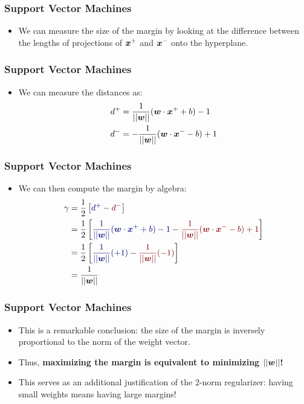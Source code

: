 \documentclass[trans]{beamer}
\begin{document}
\begin{frame}
  \frametitle{Support Vector Machines}
\begin{itemize}
\item We can measure the size of the margin by
looking at the difference between the lengths of projections of
${\boldsymbol{x}}^+$ and ${\boldsymbol{x}}^-$ onto the hyperplane.  
\end{itemize}
\end{frame}
\begin{frame}
  \frametitle{Support Vector Machines}
\begin{itemize}
\item 
We can measure the distances as:
%
\begin{align}
d^+ &= \frac 1 {\left\vert\left\vert {\boldsymbol{w}} \right\vert\right\vert} ({\boldsymbol{w}} \cdot {\boldsymbol{x}}^+ + b) - 1 \\
d^- &= - \frac 1 {\left\vert\left\vert {\boldsymbol{w}} \right\vert\right\vert}({\boldsymbol{w}} \cdot {\boldsymbol{x}}^- - b) + 1
\end{align}
%
\end{itemize}
\end{frame}
\begin{frame}
  \frametitle{Support Vector Machines}
\begin{itemize}
\item We can then compute the margin by algebra:
%
\begin{align}
\ga
&= \frac 1 2 \left[ \textcolor{darkblue}{d^+} 
                  - \textcolor{darkred}{d^-} \right] \\
&= \frac 1 2
   \left[
   \textcolor{darkblue}{\frac 1 {\norm{\vw}} (\dotp{\vw}{\vx^+} + b) - 1}
 - \textcolor{darkred}{\frac 1 {\norm{\vw}} (\dotp{\vw}{\vx^-} - b) + 1}
   \right]
\\
&= \frac 1 2 \left[
   \textcolor{darkblue}{\frac 1 {\norm{\vw}} (+1) }
 - \textcolor{darkred}{\frac 1 {\norm{\vw}} (-1) }
 \right]
\\
&= \frac 1 {\norm{\vw}}
\end{align}
%
\end{itemize}
\end{frame}
\begin{frame}
  \frametitle{Support Vector Machines}
\begin{itemize}
\item 
This is a remarkable conclusion: the size of the margin is inversely
proportional to the norm of the weight vector.
\item   Thus, {\bf maximizing
  the margin is equivalent to minimizing $\left\vert\left\vert {\boldsymbol{w}} \right\vert\right\vert$!}  
  \item This serves
as an additional justification of the $2$-norm regularizer: having
small weights means having large margins!
\end{itemize}
\end{frame}
\end{document}
